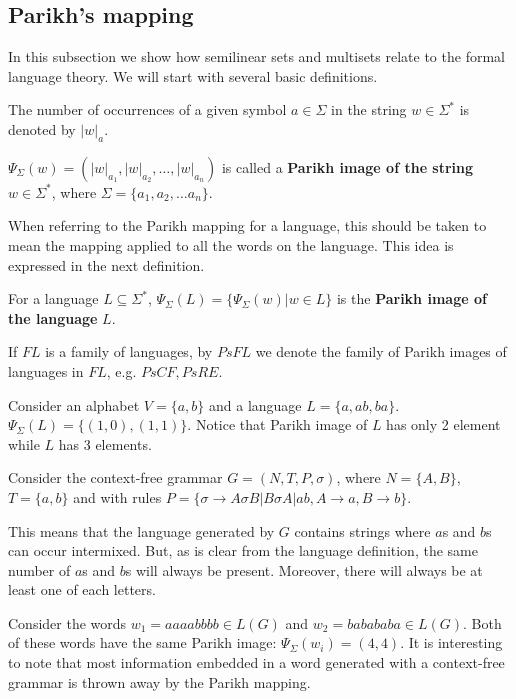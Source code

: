 \subsection{Parikh's mapping} %
\label{sec:parikh_s_mapping}

In this subsection we show how semilinear sets and multisets relate to the formal language theory. We will start with several basic definitions.

The number of occurrences of a given symbol $a\in \Sigma$ in the string $w\in \Sigma^*$ is denoted by $|w|_a$.

\begin{definition}
$\Psi_\Sigma(w)=(|w|_{a_1},|w|_{a_2},\ldots,|w|_{a_n})$ is called a {\bf Parikh image of the string} $w\in \Sigma^*$, where $\Sigma=\{a_1,a_2,\ldots a_n\}$.
\end{definition}

When referring to the Parikh mapping for a language, this should be taken to mean the mapping applied to all the words on the language. This idea is expressed in the next definition. 

\begin{definition}
For a language $L\subseteq \Sigma^*$, $\Psi_\Sigma(L)=\{\Psi_\Sigma(w)|w\in L\}$ is the {\bf Parikh image of the language} $L$.
\end{definition}

\begin{definition}
If $FL$ is a family of languages, by $PsFL$ we denote the family of Parikh images of languages in $FL$, e.g. $PsCF, PsRE$.
\end{definition}

\begin{example}
Consider an alphabet $V=\{a,b\}$ and a language $L=\{a, ab, ba\}$.
$\Psi_\Sigma(L)=\{(1,0), (1,1)\}$. Notice that Parikh image of $L$ has only 2 element while $L$ has 3 elements.
\end{example}

\begin{example}
  Consider the context-free grammar $G = (N,T,P,\sigma)$, where $N=\{A,B\}$, $T=\{a,b\}$ and with rules $P=\{\sigma\rightarrow A\sigma B|B\sigma A|ab, A\rightarrow a, B\rightarrow b\}$.

  This means that the language generated by $G$ contains strings where $a$s and $b$s can occur intermixed. But, as is clear from the language definition, the same number of $a$s and $b$s will always be present. Moreover, there will always be at least one of each letters.

  Consider the words $w_1 = aaaabbbb \in L(G)$ and $w_2 = babababa \in L(G)$. Both of these words have the same Parikh image: $\Psi_\Sigma(w_i) = (4,4)$. It is interesting to note that most information embedded in a word generated with a context-free grammar is thrown away by the Parikh mapping.
\end{example}

